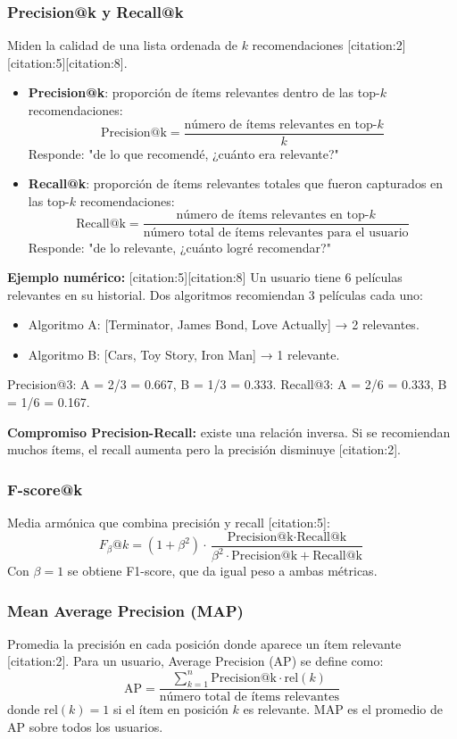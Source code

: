 \documentclass[12pt,a4paper,openany,oneside]{book}
\begin{document}
\subsubsection{Precision@k y Recall@k}
Miden la calidad de una lista ordenada de \(k\) recomendaciones [citation:2][citation:5][citation:8].

\begin{itemize}
    \item \textbf{Precision@k}: proporción de ítems relevantes dentro de las top-\(k\) recomendaciones:
    \[
    \text{Precision@k} = \frac{\text{número de ítems relevantes en top-}k}{k}
    \]
    Responde: "de lo que recomendé, ¿cuánto era relevante?"
    
    \item \textbf{Recall@k}: proporción de ítems relevantes totales que fueron capturados en las top-\(k\) recomendaciones:
    \[
    \text{Recall@k} = \frac{\text{número de ítems relevantes en top-}k}{\text{número total de ítems relevantes para el usuario}}
    \]
    Responde: "de lo relevante, ¿cuánto logré recomendar?"
\end{itemize}

\textbf{Ejemplo numérico:} [citation:5][citation:8]
Un usuario tiene 6 películas relevantes en su historial. Dos algoritmos recomiendan 3 películas cada uno:
\begin{itemize}
    \item Algoritmo A: [Terminator, James Bond, Love Actually] → 2 relevantes.
    \item Algoritmo B: [Cars, Toy Story, Iron Man] → 1 relevante.
\end{itemize}
Precision@3: A = 2/3 = 0.667, B = 1/3 = 0.333.
Recall@3: A = 2/6 = 0.333, B = 1/6 = 0.167.

\textbf{Compromiso Precision-Recall:} existe una relación inversa. Si se recomiendan muchos ítems, el recall aumenta pero la precisión disminuye [citation:2].

\subsubsection{F-score@k}
Media armónica que combina precisión y recall [citation:5]:
\[
F_{\beta}@k = (1 + \beta^2) \cdot \frac{\text{Precision@k} \cdot \text{Recall@k}}{\beta^2 \cdot \text{Precision@k} + \text{Recall@k}}
\]
Con \(\beta=1\) se obtiene F1-score, que da igual peso a ambas métricas.

\subsubsection{Mean Average Precision (MAP)}
Promedia la precisión en cada posición donde aparece un ítem relevante [citation:2]. Para un usuario, Average Precision (AP) se define como:
\[
\text{AP} = \frac{\sum_{k=1}^n \text{Precision@k} \cdot \text{rel}(k)}{\text{número total de ítems relevantes}}
\]
donde \(\text{rel}(k)=1\) si el ítem en posición \(k\) es relevante. MAP es el promedio de AP sobre todos los usuarios.
\end{document}

